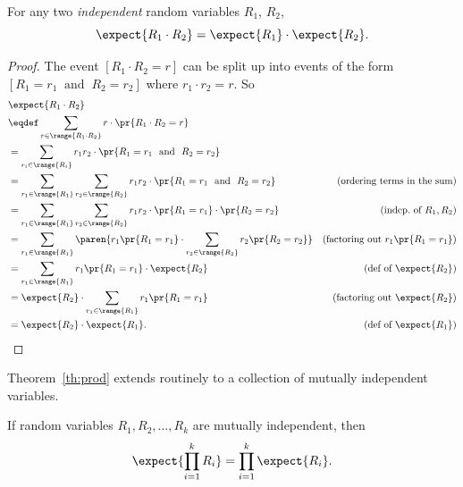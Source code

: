 \begin{theorem}\label{th:prod}
For any two \emph{independent} random variables $R_1$, $R_2$,
\[
\expect{R_1 \cdot R_2} = \expect{R_1} \cdot \expect{R_2}.
\]
\end{theorem}

\begin{proof}
The event $[R_1 \cdot R_2=r]$ can be split up into events of the form
$[R_1 = r_1\ \text{ and }\ R_2 = r_2]$ where $r_1\cdot r_2=r$.  So
\begin{align*}
\lefteqn{\expect{R_1 \cdot R_2}}\\
& \eqdef \sum_{r \in \range{R_1\cdot R_2}} r\cdot \pr{R_1\cdot R_2=r}\\
\iffalse
& =      \sum_{\scriptsize \begin{aligned}
                       r_1 \in \range{R_1},\\
                       r_2 \in \range{R_2}
                      \end{aligned}}\fi
& =      \sum_{r_i \in \range{R_i}}
            r_1 r_2 \cdot \pr{R_1=r_1\ \text{ and }\ R_2=r_2}\\
& =      \sum_{r_1 \in \range{R_1}} \sum_{r_2 \in \range{R_2}}
            r_1 r_2 \cdot \pr{R_1=r_1\ \text{ and }\ R_2=r_2}
                    &\text{(ordering terms in the sum)}\\
& =      \sum_{r_1 \in \range{R_1}} \sum_{r_2 \in \range{R_2}}
            r_1 r_2 \cdot \pr{R_1=r_1}\cdot \pr{R_2=r_2}
                    &\text{(indep.\ of $R_1,R_2$)}\\
& =      \sum_{r_1 \in \range{R_1}} \paren{r_1\pr{R_1=r_1} \cdot
              \sum_{r_2 \in \range{R_2}} r_2 \pr{R_2=r_2}}
                    &\text{(factoring out $r_1\pr{R_1=r_1}$)}\\
& =      \sum_{r_1 \in \range{R_1}} r_1\pr{R_1=r_1} \cdot \expect{R_2}
                    &\text{(def of $\expect{R_2}$)}\\
& =       \expect{R_2} \cdot \sum_{r_1 \in \range{R_1}} r_1\pr{R_1=r_1}
                    &\text{(factoring out $\expect{R_2}$)}\\
& =       \expect{R_2} \cdot  \expect{R_1}.
                    &\text{(def of $\expect{R_1}$)}
\end{align*}

\end{proof}

Theorem~\ref{th:prod} extends routinely to a collection of mutually
independent variables.
\begin{corollary}
If random variables $R_1, R_2, \dots, R_k$ are mutually
independent, then
\[
\expect{\prod_{i=1}^k R_i} = \prod_{i=1}^k \expect{R_i}.
\]
\end{corollary}


